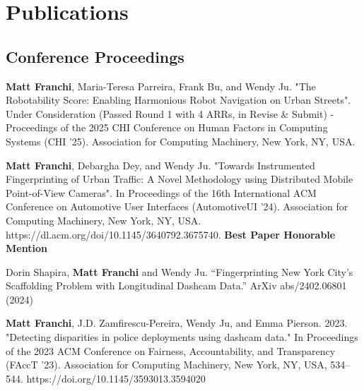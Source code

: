 \documentclass[11pt,letterpaper]{report}
\begin{document}
    \clearpage



    \section*{Publications}

    \subsection*{Conference Proceedings}

    \begin{tablist}

        \item[2025.a] \tab{}\textbf{Matt Franchi}, Maria-Teresa Parreira, Frank Bu, and Wendy Ju. "The Robotability Score: Enabling Harmonious Robot Navigation on Urban Streets". Under Consideration (Passed Round 1 with 4 ARRs, in Revise \& Submit) - Proceedings of the 2025 CHI Conference on Human Factors in Computing Systems (CHI '25). Association for Computing Machinery, New York, NY, USA.  
        \item[\rule{2em}{0.4pt}]
    
        \item[2024.b] \tab{}\textbf{Matt Franchi}, Debargha Dey, and Wendy Ju. "Towards Instrumented Fingerprinting of Urban Traffic: A Novel Methodology using Distributed Mobile Point-of-View Cameras". In Proceedings of the 16th International ACM Conference on Automotive User Interfaces (AutomotiveUI '24). Association for Computing Machinery, New York, NY, USA. https://dl.acm.org/doi/10.1145/3640792.3675740. \newline \textbf{Best Paper Honorable Mention} 
    
        \item[2024.a] \tab{}Dorin Shapira, \textbf{Matt Franchi} and Wendy Ju. “Fingerprinting New York City's Scaffolding Problem with Longitudinal Dashcam Data.” ArXiv abs/2402.06801 (2024)

        \item[\rule{2em}{0.4pt}]
        
        \item[2023.a] \tab{}\textbf{Matt Franchi}, J.D. Zamfirescu-Pereira, Wendy Ju, and Emma Pierson. 2023. "Detecting disparities in police deployments using dashcam data." In Proceedings of the 2023 ACM Conference on Fairness, Accountability, and Transparency (FAccT '23). Association for Computing Machinery, New York, NY, USA, 534–544. https://doi.org/10.1145/3593013.3594020


\end{tablist}
\end{document}
